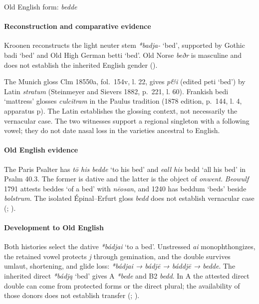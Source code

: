 \documentclass[
  british,
  a4paper,
]{article}
\providecommand{\Recon}[1]{\emph{*#1}}
\begin{document}
Old English form: \emph{bedde}

\paragraph{Reconstruction and comparative
evidence}\label{reconstruction-and-comparative-evidence-2}

Kroonen reconstructs the light neuter stem \Recon{badja-} `bed',
supported by Gothic {badi} `bed' and Old High German {betti} `bed'. Old
Norse \emph{beðr} is masculine and does not establish the inherited
English gender ().

The Munich gloss Clm 18550a, fol.~154v, l. 22, gives \emph{p\&i} (edited
{peti} `bed') by Latin \emph{stratum} (Steinmeyer and Sievers 1882,
p.~221, l. 60). Frankish {bedi} `mattress' glosses \emph{culcitram} in
the Paulus tradition (1878 edition, p.~144, l. 4, apparatus p). The
Latin establishes the glossing context, not necessarily the vernacular
case. The two witnesses support a regional singleton with a following
vowel; they do not date nasal loss in the varieties ancestral to
English.

\paragraph{Old English evidence}\label{old-english-evidence-2}

The Paris Psalter has \emph{tō his bedde} `to his bed' and \emph{eall
his} {bedd} `all his bed' in Psalm 40.3. The former is dative and the
latter is the object of \emph{onwent}. \emph{Beowulf} 1791 attests
{beddes} `of a bed' with \emph{nēosan}, and 1240 has {beddum} `beds'
beside \emph{bolstrum}. The isolated Épinal--Erfurt gloss \emph{bedd}
does not establish vernacular case (; ).

\paragraph{Development to Old
English}\label{development-to-old-english-2}

Both histories select the dative \Recon{bádjai} `to a bed'. Unstressed
\emph{ai} monophthongizes, the retained vowel protects \emph{j} through
gemination, and the double survives umlaut, shortening, and glide loss:
\emph{*bádjai → bádjē → báddjē → bedde}. The inherited direct
\Recon{bádją} `bed' gives A \emph{*bede} and B2 \emph{bedd}. In A the
attested direct double can come from protected forms or the direct
plural; the availability of those donors does not establish transfer
(;
).
\end{document}
